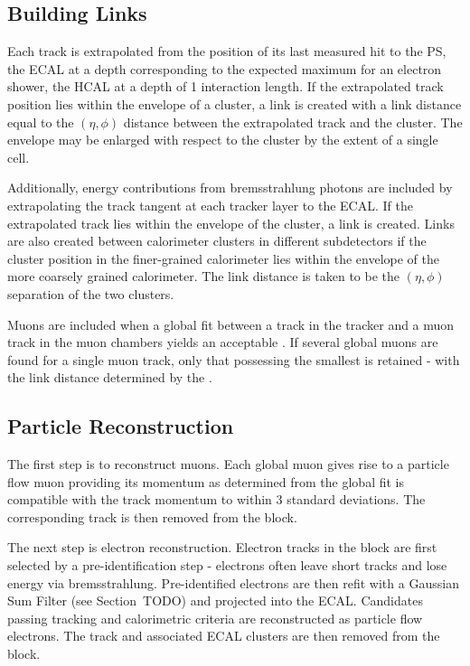 \subsection{Building Links}
Each track is extrapolated from the position of its last measured hit to the
\ac{PS}, the \ac{ECAL} at a depth corresponding to the expected maximum for an
electron shower, the \ac{HCAL} at a depth of 1 interaction length. If the
extrapolated track position lies within the envelope of a cluster, a link is
created with a link distance equal to the $(\eta, \phi)$ distance between the
extrapolated track and the cluster. The envelope may be enlarged with respect to
the cluster by the extent of a single cell.

Additionally, energy contributions from bremsstrahlung photons are included by
extrapolating the track tangent at each tracker layer to the \ac{ECAL}. If the
extrapolated track lies within the envelope of the cluster, a link is created.
Links are also created between calorimeter clusters in different subdetectors if
the cluster position in the finer-grained calorimeter lies within the envelope
of the more coarsely grained calorimeter. The link distance is taken to be the
$(\eta, \phi)$ separation of the two clusters.

Muons are included when a global fit between a track in the tracker and a muon
track in the muon chambers yields an acceptable \chisq. If several global muons
are found for a single muon track, only that possessing the smallest \chisq is
retained - with the link distance determined by the \chisq.

\subsection{Particle Reconstruction}
The first step is to reconstruct muons. Each global muon gives rise to a
particle flow muon providing its momentum as determined from the global fit is
compatible with the track momentum to within 3 standard deviations. The
corresponding track is then removed from the block.

The next step is electron reconstruction. Electron tracks in the block are first
selected by a pre-identification step - electrons often leave short tracks and
lose energy via bremsstrahlung. Pre-identified electrons are then refit with a
Gaussian Sum Filter (see Section~TODO) and projected into the \ac{ECAL}.
Candidates passing tracking and calorimetric criteria are reconstructed as
particle flow electrons. The track and associated \ac{ECAL} clusters are then
removed from the block.

